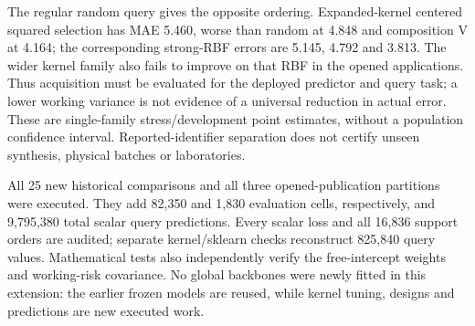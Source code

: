 The regular random query gives the opposite ordering. Expanded-kernel centered squared selection has MAE 5.460, worse than random at 4.848 and composition V at 4.164; the corresponding strong-RBF errors are 5.145, 4.792 and 3.813. The wider kernel family also fails to improve on that RBF in the opened applications. Thus acquisition must be evaluated for the deployed predictor and query task; a lower working variance is not evidence of a universal reduction in actual error. These are single-family stress/development point estimates, without a population confidence interval. Reported-identifier separation does not certify unseen synthesis, physical batches or laboratories.

All 25 new historical comparisons and all three opened-publication partitions were executed. They add 82,350 and 1,830 evaluation cells, respectively, and 9,795,380 total scalar query predictions. Every scalar loss and all 16,836 support orders are audited; separate kernel/sklearn checks reconstruct 825,840 query values. Mathematical tests also independently verify the free-intercept weights and working-risk covariance. No global backbones were newly fitted in this extension: the earlier frozen models are reused, while kernel tuning, designs and predictions are new executed work.
